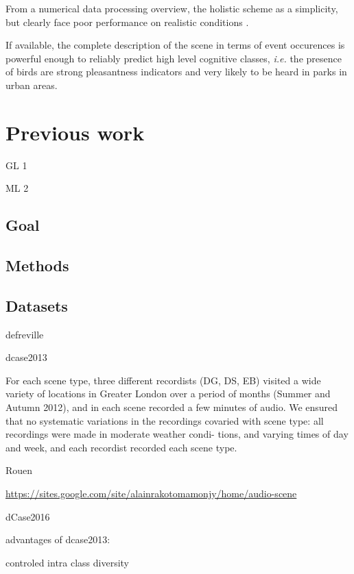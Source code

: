 \documentclass[journal]{IEEEtran}
\begin{document}
From a numerical data processing overview, the holistic scheme as a simplicity, but clearly face poor performance on realistic conditions \cite{lagrange:hal-01082501}.

If available, the complete description of the scene in terms of event occurences is powerful enough to reliably predict high level cognitive classes, \textit{i.e.} the presence of birds are strong pleasantness indicators and very likely to be heard in parks in urban areas.

\section{Previous work}

GL 1

ML 2

\subsection{Goal}

\subsection{Methods}

\subsection{Datasets}

defreville \cite{aucouturier2007bag}

\cite{lagrange:hal-01082501}

dcase2013 \cite{7100934} \cite{giannoulis2013database}

For each scene type, three different recordists (DG, DS,
EB) visited a wide variety of locations in Greater London over
a period of months (Summer and Autumn 2012), and in each
scene recorded a few minutes of audio. We ensured that no
systematic variations in the recordings covaried with scene
type: all recordings were made in moderate weather condi-
tions, and varying times of day and week, and each recordist
recorded each scene type.

Rouen \cite{rakotomamonjy2015histogram}

\url{https://sites.google.com/site/alainrakotomamonjy/home/audio-scene}

dCase2016 \cite{Mesaros2016_EUSIPCO}

advantages of dcase2013:

controled intra class diversity
\end{document}
